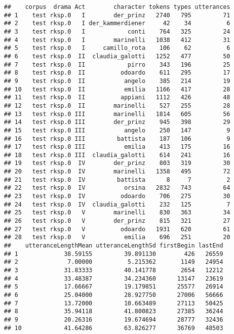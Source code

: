 \documentclass[]{book}
\begin{document}
\begin{verbatim}
##    corpus  drama Act        character tokens types utterances
## 1    test rksp.0   I        der_prinz   2740   795         71
## 2    test rksp.0   I der_kammerdiener     42    34          6
## 3    test rksp.0   I            conti    764   325         24
## 4    test rksp.0   I        marinelli   1038   412         31
## 5    test rksp.0   I     camillo_rota    106    62          6
## 6    test rksp.0  II  claudia_galotti   1252   477         50
## 7    test rksp.0  II            pirro    343   196         25
## 8    test rksp.0  II          odoardo    611   295         17
## 9    test rksp.0  II           angelo    385   214         19
## 10   test rksp.0  II           emilia   1166   417         28
## 11   test rksp.0  II          appiani   1112   426         48
## 12   test rksp.0  II        marinelli    527   255         28
## 13   test rksp.0 III        marinelli   1814   605         56
## 14   test rksp.0 III        der_prinz    945   398         29
## 15   test rksp.0 III           angelo    250   147          9
## 16   test rksp.0 III         battista    187   106          9
## 17   test rksp.0 III           emilia    413   175         16
## 18   test rksp.0 III  claudia_galotti    614   241         16
## 19   test rksp.0  IV        der_prinz    803   319         30
## 20   test rksp.0  IV        marinelli   1358   495         72
## 21   test rksp.0  IV         battista      8     7          2
## 22   test rksp.0  IV           orsina   2832   743         64
## 23   test rksp.0  IV          odoardo    706   275         30
## 24   test rksp.0  IV  claudia_galotti    232   125          7
## 25   test rksp.0   V        marinelli    830   363         34
## 26   test rksp.0   V        der_prinz    815   321         27
## 27   test rksp.0   V          odoardo   1931   620         61
## 28   test rksp.0   V           emilia    696   251         20
##    utteranceLengthMean utteranceLengthSd firstBegin lastEnd
## 1             38.59155         39.891130        426   26559
## 2              7.00000          5.215362       1149   24954
## 3             31.83333         40.141778       2654   12212
## 4             33.48387         34.234360      13147   23619
## 5             17.66667         19.179851      25577   26914
## 6             25.04000         28.927750      27006   56666
## 7             13.72000         10.663489      27113   50425
## 8             35.94118         41.800823      27385   36244
## 9             20.26316         19.674694      28777   32436
## 10            41.64286         63.826277      36769   48503

\end{verbatim}
\end{document}
